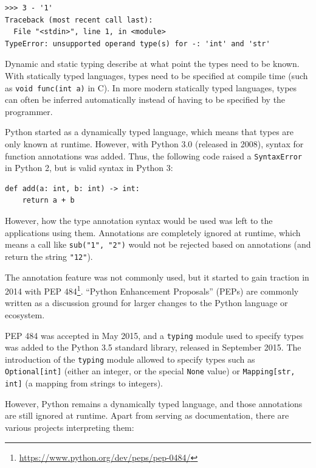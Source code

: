 \documentclass[a4paper,parskip=full]{scrreprt}
\newcommand{\py}[1]{\texttt{#1}}
\begin{document}
\begin{verbatim}
>​>​> 3 - '1'
Traceback (most recent call last):
  File "<stdin>", line 1, in <module>
TypeError: unsupported operand type(s) for -: 'int' and 'str'
\end{verbatim}

Dynamic and static typing describe at what point the types need to be known.
With statically typed languages, types need to be specified at compile time
(such as \texttt{void func(int a)} in C). In more modern statically typed
languages, types can often be inferred automatically instead of having to be
specified by the programmer.

Python started as a dynamically typed language, which means that types are only
known at runtime. However, with Python 3.0 (released in 2008), syntax for
function annotations was added. Thus, the following code raised a
\verb|SyntaxError| in Python 2, but is valid syntax in Python 3:

\begin{verbatim}
def add(a: int, b: int) -> int:
    return a + b
\end{verbatim}

However, how the type annotation syntax would be used was left to the
applications using them. Annotations are completely ignored at runtime, which
means a call like \py{sub("1", "2")} would not be rejected based on annotations
(and return the string \py{"12"}).

The annotation feature was not commonly used, but it started to gain traction
in 2014 with PEP 484\footnote{\url{https://www.python.org/dev/peps/pep-0484/}}.
``Python Enhancement Proposals'' (PEPs) are commonly written as a discussion
ground for larger changes to the Python language or ecosystem.

PEP 484 was accepted in May 2015, and a \verb|typing| module used to specify types
was added to the Python 3.5 standard library, released in September 2015. The
introduction of the \verb|typing| module allowed to specify types such as
\py{Optional[int]} (either an integer, or the special \py{None} value) or
\py{Mapping[str, int]} (a mapping from strings to integers).

However, Python remains a dynamically typed language, and those annotations are
still ignored at runtime. Apart from serving as documentation, there are various
projects interpreting them:
\end{document}

